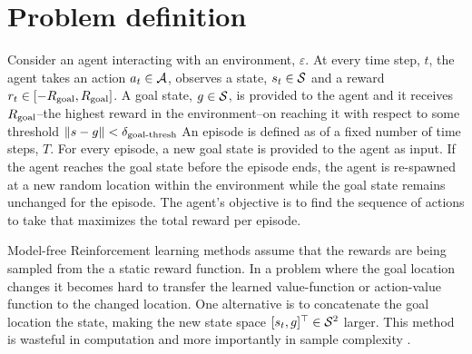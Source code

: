 \section{Problem definition}

Consider an agent interacting with an environment, $\varepsilon$. At
every time step, $t$, the agent takes an action $a_t \in \mathcal{A}$, observes a
state, $s_t \in \mathcal{S}$ and a reward $r_t \in [-R_{\text{goal}}, R_{\text{goal}}]$.
A goal state, $g \in \mathcal{S}$, is provided to the agent and it receives
$R_{\text{goal}}$--the highest reward in the environment--on reaching it
with respect to some threshold $\|s -g\| < \delta_{\text{goal-thresh}}$
An episode is defined as of a fixed number of time steps, $T$. For
every episode, a new goal state is provided to the agent as input. If the agent
reaches the goal state before the episode ends, the agent is 
re-spawned at a new random location within the environment while the goal state
remains unchanged for the episode.
The agent's objective is to find the sequence of actions to take that maximizes
the total reward per episode. 


%
%

%

Model-free Reinforcement learning methods assume that the rewards are
being sampled from the a static reward function.  In a problem where the
goal location changes it becomes hard to transfer the learned
value-function or action-value function to the changed location.  One
alternative is to concatenate the goal location the state, making the
new state space $[s_t, g]^\top \in \mathcal{S}^2$ larger.  This
method is wasteful in computation and more importantly in sample
complexity \cite{schaul2015universal}.

